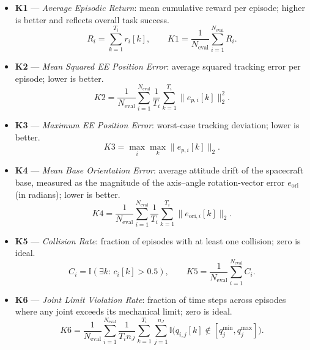 \documentclass{ieeeaccess}
\begin{document}
\begin{itemize}
  \item \textbf{K1} --- \emph{Average Episodic Return}: mean cumulative reward per episode; higher is better and reflects overall task success.
  \begin{equation*}
  R_i=\sum_{k=1}^{T_i} r_i[k], \qquad K1=\frac{1}{N_{\text{eval}}}\sum_{i=1}^{N_{\text{eval}}} R_i.
  \end{equation*}

  \item \textbf{K2} --- \emph{Mean Squared EE Position Error}: average squared tracking error per episode; lower is better.
  \begin{equation*}
  K2=\frac{1}{N_{\text{eval}}}\sum_{i=1}^{N_{\text{eval}}}\frac{1}{T_i}\sum_{k=1}^{T_i}\|e_{p,i}[k]\|_2^2.
  \end{equation*}

  \item \textbf{K3} --- \emph{Maximum EE Position Error}: worst-case tracking deviation; lower is better.
  \begin{equation*}
  K3=\max_{i}\max_{k}\|e_{p,i}[k]\|_2.
  \end{equation*}

  \item \textbf{K4} --- \emph{Mean Base Orientation Error}: average attitude drift of the spacecraft base, measured as the magnitude of the axis--angle rotation-vector error $e_{\mathrm{ori}}$ (in radians); lower is better.
  \begin{equation*}
  K4=\frac{1}{N_{\text{eval}}}\sum_{i=1}^{N_{\text{eval}}}\frac{1}{T_i}\sum_{k=1}^{T_i}\|e_{\mathrm{ori},i}[k]\|_2.
  \end{equation*}

  \item \textbf{K5} --- \emph{Collision Rate}: fraction of episodes with at least one collision; zero is ideal.
  \begin{equation*}
  C_i=\mathbb{I}(\exists k:\,c_i[k]>0.5), \qquad K5=\frac{1}{N_{\text{eval}}}\sum_{i=1}^{N_{\text{eval}}} C_i.
  \end{equation*}

  \item \textbf{K6} --- \emph{Joint Limit Violation Rate}: fraction of time steps across episodes where any joint exceeds its mechanical limit; zero is ideal.
  \begin{equation*}
  K6=\frac{1}{N_{\text{eval}}}\sum_{i=1}^{N_{\text{eval}}}\frac{1}{T_i n_J}\sum_{k=1}^{T_i}\sum_{j=1}^{n_J}
  \mathbb{I}\!\big(q_{i,j}[k]\notin[q_j^{\min},q_j^{\max}]\big).
  \end{equation*}


\end{itemize}
\end{document}
